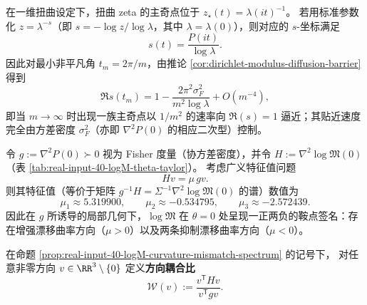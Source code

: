 \begin{remark}[“Siegel 条带”型逼近：扭曲主极点以 \texorpdfstring{$1/m^2$}{1/m2} 速度贴近 \texorpdfstring{$\Re(s)=1$}{Re(s)=1}]
在一维扭曲设定下，扭曲 zeta 的主奇点位于
\(
z_\star(t)=\lambda(it)^{-1}
\)。
若用标准参数化 \(z=\lambda^{-s}\)（即 \(s=-\log z/\log\lambda\)，其中 \(\lambda=\lambda(0)\)），则对应的 \(s\)-坐标满足
\[
s(t)=\frac{P(it)}{\log\lambda}.
\]
因此对最小非平凡角 \(t_m=2\pi/m\)，由推论 \ref{cor:dirichlet-modulus-diffusion-barrier} 得到
\[
\Re s(t_m)
=1-\frac{2\pi^2\sigma_F^2}{m^2\log\lambda}+O(m^{-4}),
\]
即当 \(m\to\infty\) 时出现一族主奇点以 \(1/m^2\) 的速率向 \(\Re(s)=1\) 逼近；其贴近速度完全由方差密度 \(\sigma_F^2\)（亦即 \(\nabla^2P(0)\) 的相应二次型）控制。
\end{remark}

\begin{proposition}\label{prop:real-input-40-logM-curvature-mismatch-spectrum}
令 \(g:=\nabla^2P(0)\succ 0\) 视为 Fisher 度量（协方差密度），并令 \(H:=\nabla^2\log\mathfrak{M}(0)\)（表 \ref{tab:real-input-40-logM-theta-taylor}）。
考虑广义特征值问题
\[
Hv=\mu\,gv.
\]
则其特征值（等价于矩阵 \(g^{-1}H=\Sigma^{-1}\nabla^2\log\mathfrak{M}(0)\) 的谱）数值为
\[
\mu_1\approx 5.319900,\qquad
\mu_2\approx -0.534795,\qquad
\mu_3\approx -2.572439.
\]
因此在 \(g\) 所诱导的局部几何下，\(\log\mathfrak{M}\) 在 \(\theta=0\) 处呈现一正两负的鞍点签名：存在增强漂移曲率方向（\(\mu>0\)）以及两条抑制漂移曲率方向（\(\mu<0\)）。
\end{proposition}

\begin{definition}\label{def:real-input-40-directional-coupling}
在命题 \ref{prop:real-input-40-logM-curvature-mismatch-spectrum} 的记号下，
对任意非零方向 \(v\in\RR^3\setminus\{0\}\) 定义\textbf{方向耦合比}
\[
\mathcal{W}(v):=\frac{v^{\mathsf T}Hv}{v^{\mathsf T}gv}.
\]
\end{definition}

